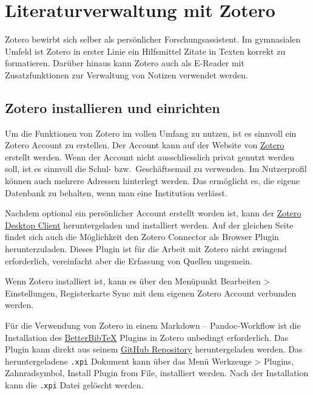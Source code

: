 \documentclass[
  nswissgerman,
  a4paper,
  DIV=11,
  numbers=noendperiod,
  ngerman]{scrreprt}
\begin{document}
\chapter{Literaturverwaltung mit
Zotero}\label{literaturverwaltung-mit-zotero}

Zotero bewirbt sich selber als persönlicher Forschungsassistent. Im
gymnasialen Umfeld ist Zotero in erster Linie ein Hilfsmittel Zitate in
Texten korrekt zu formatieren. Darüber hinaus kann Zotero auch als
E-Reader mit Zusatzfunktionen zur Verwaltung von Notizen verwendet
werden.

\section{Zotero installieren und
einrichten}\label{zotero-installieren-und-einrichten}

Um die Funktionen von Zotero im vollen Umfang zu nutzen, ist es sinnvoll
ein Zotero Account zu erstellen. Der Account kann auf der Website von
\href{https://www.zotero.org/user/register}{Zotero} erstellt werden.
Wenn der Account nicht ausschliesslich privat genutzt werden soll, ist
es sinnvoll die Schul- bzw.~Geschäftsemail zu verwenden. Im Nutzerprofil
können auch mehrere Adressen hinterlegt werden. Das ermöglicht es, die
eigene Datenbank zu behalten, wenn man eine Institution verlässt.

Nachdem optional ein persönlicher Account erstellt worden ist, kann der
\href{https://www.zotero.org/download/}{Zotero Desktop Client}
heruntergeladen und installiert werden. Auf der gleichen Seite findet
sich auch die Möglichkeit den Zotero Connector als Browser Plugin
herunterzuladen. Dieses Plugin ist für die Arbeit mit Zotero nicht
zwingend erforderlich, vereinfacht aber die Erfassung von Quellen
ungemein.

Wenn Zotero installiert ist, kann es über den Menüpunkt Bearbeiten
\textgreater{} Einstellungen, Registerkarte Sync mit dem eigenen Zotero
Account verbunden werden.

Für die Verwendung von Zotero in einem Markdown -- Pandoc-Workflow ist
die Installation des
\href{https://retorque.re/zotero-better-bibtex/}{BetterBibTeX} Plugins
in Zotero unbedingt erforderlich. Das Plugin kann direkt aus seinem
\href{https://github.com/retorquere/zotero-better-bibtex/releases/latest}{GitHub
Repository} heruntergeladen werden. Das heruntergeladene \texttt{.xpi}
Dokument kann über das Menü Werkzeuge \textgreater{} Plugins,
Zahnradsymbol, Install Plugin from File, installiert werden. Nach der
Installation kann die \texttt{.xpi} Datei gelöscht werden.
\end{document}
